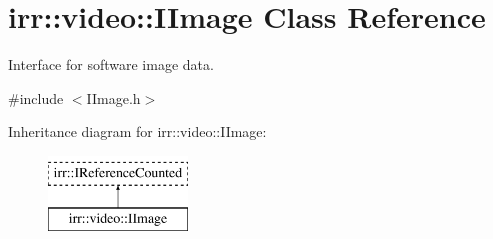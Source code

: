 \hypertarget{classirr_1_1video_1_1IImage}{}\section{irr\+:\+:video\+:\+:I\+Image Class Reference}
\label{classirr_1_1video_1_1IImage}


Interface for software image data.  




{\ttfamily \#include $<$I\+Image.\+h$>$}

Inheritance diagram for irr\+:\+:video\+:\+:I\+Image\+:\begin{figure}[H]
\begin{center}
\leavevmode
\includegraphics[height=2.000000cm]{classirr_1_1video_1_1IImage}
\end{center}
\end{figure}
